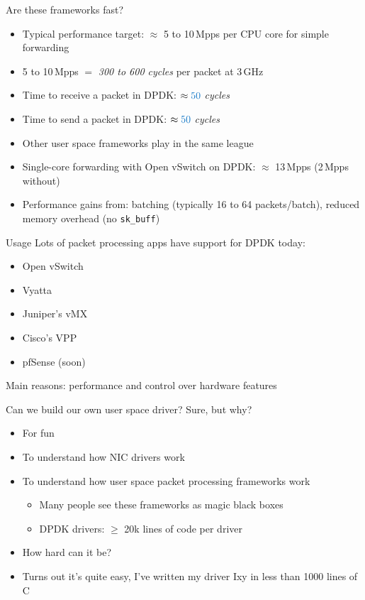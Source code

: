 \documentclass[NET,english,aspectratio=169,notitleframe]{tumbeamer}
\begin{document}
\begin{frame}{Are these frameworks fast?}
\begin{itemize}
\item<1-> Typical performance target: $\approx$ 5 to 10\,Mpps per CPU core for simple forwarding
\item<1-> 5 to 10\,Mpps $=$ \emph{300 to 600 cycles} per packet at 3\,GHz
\vspace{1em}
\item<2-> Time to receive a packet in DPDK: $\approx \emph{50}$ \emph{cycles}
\item<2-> Time to send a packet in DPDK: $\approx \emph{50}$ \emph{cycles}
\item<2-> Other user space frameworks play in the same league
\vspace{1em}
\item<2-> Single-core forwarding with Open vSwitch on DPDK: $\approx$ 13\,Mpps (2\,Mpps without)
\item<2-> Performance gains from: batching (typically 16 to 64 packets/batch), reduced memory overhead (no \texttt{sk\_buff})
\end{itemize}
\end{frame}

\begin{frame}{Usage}
Lots of packet processing apps have support for DPDK today:
\begin{itemize}
\item Open vSwitch
\item Vyatta
\item Juniper's vMX
\item Cisco's VPP
\item pfSense (soon)
\end{itemize}
Main reasons: performance and control over hardware features
\end{frame}

\begin{frame}{Can we build our own user space driver?}
Sure, but why?
\begin{itemize}
\item For fun 
\item To understand how NIC drivers work
\item To understand how user space packet processing frameworks work
\begin{itemize}
\item Many people see these frameworks as magic black boxes
\item DPDK drivers: $\ge$ 20k lines of code per driver
\end{itemize}
\item How hard can it be?
\item Turns out it's quite easy, I've written my driver Ixy in less than 1000 lines of C
\end{itemize}
\end{frame}
\end{document}
